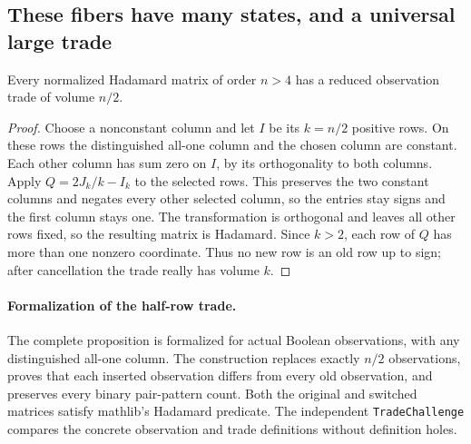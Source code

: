 \subsection{These fibers have many states, and a universal large trade}
\begin{proposition}
Every normalized Hadamard matrix of order $n>4$ has a reduced
observation trade of volume $n/2$.
\end{proposition}
\begin{proof}
Choose a nonconstant column and let $I$ be its $k=n/2$ positive rows.
On these rows the distinguished all-one column and the chosen column
are constant. Each other column has sum zero on $I$, by its
orthogonality to both columns. Apply $Q=2J_k/k-I_k$ to the selected
rows. This preserves the two constant columns and negates every other
selected column, so the entries stay signs and the first column stays
one. The transformation is orthogonal and leaves all other rows fixed,
so the resulting matrix is Hadamard. Since $k>2$, each row of $Q$
has more than one nonzero coordinate. Thus no new row is an old row
up to sign; after cancellation the trade really has volume $k$.
\end{proof}

\paragraph{Formalization of the half-row trade.}
The complete proposition is formalized for actual Boolean observations,
with any distinguished all-one column. The construction replaces exactly
$n/2$ observations, proves that each inserted observation differs from
every old observation, and preserves every binary pair-pattern count.
Both the original and switched matrices satisfy mathlib's Hadamard
predicate. The independent \texttt{TradeChallenge} compares the concrete
observation and trade definitions without definition holes.

